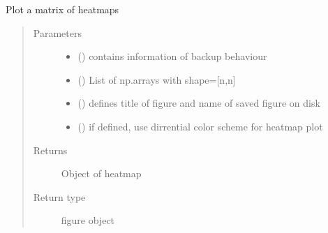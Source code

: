 \documentclass[letterpaper,10pt,english]{sphinxmanual}
\begin{document}
\begin{fulllineitems}
\label{\detokenize{SpikingConvNet:SpikingConvNet.utils.plot_heatpmap}}
Plot a matrix of heatmaps
\begin{quote}\begin{description}
\item[{Parameters}] \leavevmode\begin{itemize}
\item {} 
 () \textendash{} contains information of backup behaviour

\item {} 
 () \textendash{} List of np.arrays with shape={[}n,n{]}

\item {} 
 () \textendash{} defines title of figure and name of saved figure on disk

\item {} 
 () \textendash{} if defined, use dirrential color scheme for heatmap plot

\end{itemize}

\item[{Returns}] \leavevmode
{} \textendash{} Object of heatmap

\item[{Return type}] \leavevmode
figure object

\end{description}\end{quote}

\end{fulllineitems}

\end{document}
